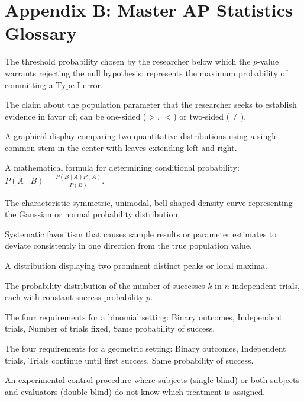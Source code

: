 \chapter{Appendix B: Master AP Statistics Glossary}

\begin{description}[leftmargin=1.5em, style=nextline]
  \item[Alpha ($\alpha$) Level] The threshold probability chosen by the researcher below which the $p$-value warrants rejecting the null hypothesis; represents the maximum probability of committing a Type I error.
  \item[Alternative Hypothesis ($H_a$)] The claim about the population parameter that the researcher seeks to establish evidence in favor of; can be one-sided ($>$, $<$) or two-sided ($\neq$).
  \item[Back-to-Back Stemplot] A graphical display comparing two quantitative distributions using a single common stem in the center with leaves extending left and right.
  \item[Bayes' Theorem] A mathematical formula for determining conditional probability: $P(A \mid B) = \frac{P(B \mid A)P(A)}{P(B)}$.
  \item[Bell Curve] The characteristic symmetric, unimodal, bell-shaped density curve representing the Gaussian or normal probability distribution.
  \item[Bias] Systematic favoritism that causes sample results or parameter estimates to deviate consistently in one direction from the true population value.
  \item[Bimodal] A distribution displaying two prominent distinct peaks or local maxima.
  \item[Binomial Distribution] The probability distribution of the number of successes $k$ in $n$ independent trials, each with constant success probability $p$.
  \item[BINS Checklist] The four requirements for a binomial setting: Binary outcomes, Independent trials, Number of trials fixed, Same probability of success.
  \item[BITS Checklist] The four requirements for a geometric setting: Binary outcomes, Independent trials, Trials continue until first success, Same probability of success.
  \item[Blinding] An experimental control procedure where subjects (single-blind) or both subjects and evaluators (double-blind) do not know which treatment is assigned.

\end{description}
